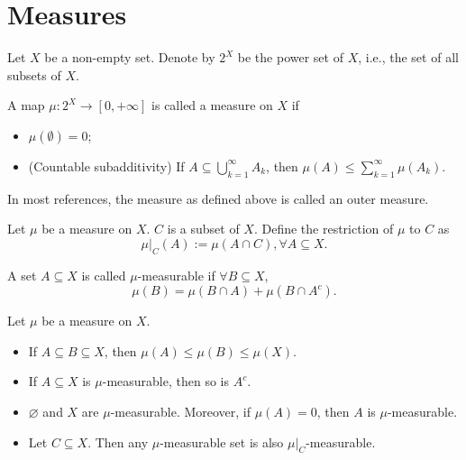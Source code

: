     \section{Measures}
    Let $X$ be a non-empty set. Denote by $2^{X}$ be the power set of $X$, i.e., the set of all subsets of $X$.
    \begin{definition}
        A map $\mu: 2^{X} \to [0,+\infty]$ is called a measure on $X$ if
        \begin{itemize}
            \item[(i)] $\mu(\emptyset)=0$;
            \item[(ii)] (Countable subadditivity) If $A \subseteq \bigcup _{k=1}^{\infty}A_{k}$, then $\mu(A)\le \sum_{k=1}^{\infty}\mu(A_{k})$.
        \end{itemize}
    \end{definition}

    \begin{remark}
        In most references, the measure as defined above is called an outer measure.
    \end{remark}

    \begin{definition}
        Let $\mu$ be a measure on $X$. $C$ is a subset of $X$. Define the restriction of $\mu$ to $C$ as
        $$
        \mu|_{C}(A):=\mu(A\cap C), \forall A \subseteq X.
        $$
    \end{definition}

    \begin{definition}
        A set $A \subseteq X$ is called $\mu$-measurable if $\forall B \subseteq X$,
        $$
        \mu(B)=\mu(B\cap A)+\mu(B \cap A^{c}).
        $$
    \end{definition}

    \begin{theorem}
        Let $\mu$ be a measure on $X$.
        \begin{itemize}
            \item[(i)] If $A \subseteq B \subseteq X$, then $\mu(A)\le \mu(B)\le \mu(X)$.
            \item[(ii)] If $A \subseteq X$ is $\mu$-measurable, then so is $A^{c}$.
            \item[(iii)] $\varnothing$ and $X$ are $\mu$-measurable. Moreover, if $\mu(A)=0$, then $A$ is $\mu$-measurable.
            \item[(iv)] Let $C \subseteq X$. Then any $\mu$-measurable set is also $\mu|_{C}$-measurable.
        \end{itemize}
    \end{theorem}

